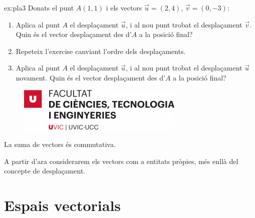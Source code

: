 \documentclass{beamer}
\begin{document}
\begin{frame}

\begin{exercise}{ex:pla3}{}
Donats el punt $A(1,1)$ i els vectors $\vec{u}=(2,4)$, $\vec{v}=(0,-3)$:
\begin{enumerate}
  \item Aplica al punt $A$ el desplaçament $\vec{u}$, i al nou punt trobat el desplaçament $\vec{v}$. Quin és el vector desplaçament des d'$A$ a la posició final?
  \item Repeteix l'exercise canviant l'ordre dels desplaçaments.
  \item Aplica al punt $A$ el desplaçament $\vec{u}$, i al nou punt trobat el desplaçament $\vec{u}$ novament. Quin és el vector desplaçament des d'$A$ a la posició final?
\end{enumerate}
\end{exercise}

\end{frame}
\begin{frame}

\begin{figure}
\includegraphics[width=0.8\linewidth]{FCTE}
\end{figure}
La suma de vectors és commutativa.

A partir d'ara considerarem els vectors com a entitats pròpies, més enllà del concepte de desplaçament.

\end{frame}

\section{Espais vectorials}
\end{document}
